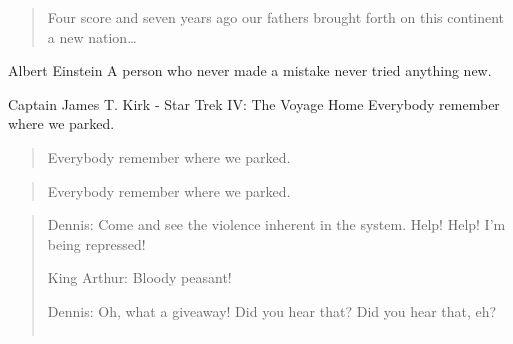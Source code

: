 \begin{quote}
Four score and seven years ago our fathers brought forth
on this continent a new nation…​
\end{quote}

\begin{aquote}{Albert Einstein}{}
A person who never made a mistake never tried anything new.
\end{aquote}

\begin{aquote}{Captain James T. Kirk}{ - Star Trek IV: The Voyage Home}
Everybody remember where we parked.
\end{aquote}

\begin{quote}
Everybody remember where we parked.
\end{quote}

\begin{quote}
Everybody remember where we parked.
\end{quote}

\begin{quote}
Dennis: Come and see the violence inherent in the system. Help! Help! I’m being repressed!


King Arthur: Bloody peasant!


Dennis: Oh, what a giveaway! Did you hear that? Did you hear that, eh?


\begin{verbatim}

\end{verbatim}

\end{quote}

